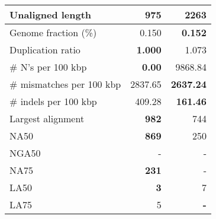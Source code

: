 \documentclass[12pt,a4paper]{article}
\begin{document}
\begin{table}[ht]
\begin{center}
\begin{tabular}{|l*{2}{|r}|}
Unaligned length & {\bf 975} & 2263 \\ \hline
Genome fraction (\%) & 0.150 & {\bf 0.152} \\ \hline
Duplication ratio & {\bf 1.000} & 1.073 \\ \hline
\# N's per 100 kbp & {\bf 0.00} & 9868.84 \\ \hline
\# mismatches per 100 kbp & 2837.65 & {\bf 2637.24} \\ \hline
\# indels per 100 kbp & 409.28 & {\bf 161.46} \\ \hline
Largest alignment & {\bf 982} & 744 \\ \hline
NA50 & {\bf 869} & 250 \\ \hline
NGA50 & - & - \\ \hline
NA75 & {\bf 231} & - \\ \hline
LA50 & {\bf 3} & 7 \\ \hline
LA75 & 5 & {\bf -} \\ \hline
\end{tabular}
\end{center}
\end{table}
\end{document}
